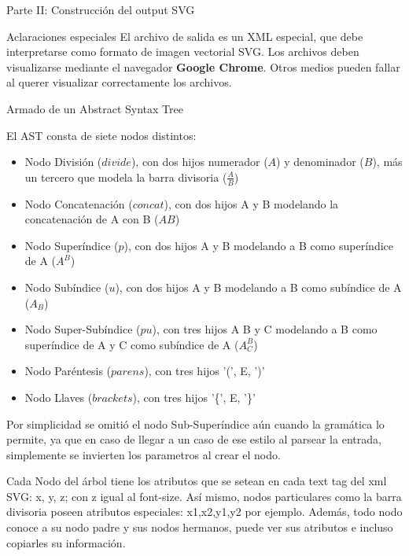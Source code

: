 \begin{section}{Parte II: Construcci\'on del output SVG}

\begin{subsection}{Aclaraciones especiales}
El archivo de salida es un XML especial, que debe interpretarse como formato de imagen vectorial SVG. Los archivos deben visualizarse mediante el navegador \textbf{Google Chrome}. Otros medios pueden fallar al querer visualizar correctamente los archivos.
\end{subsection}

\begin{subsection}{Armado de un Abstract Syntax Tree}

El AST consta de siete nodos distintos:

\begin{itemize}

\item Nodo Divisi\'on ($divide$), con dos hijos numerador ($A$) y denominador ($B$), m\'as un tercero que modela la barra divisoria ($\frac{A}{B}$)
\item Nodo Concatenaci\'on ($concat$), con dos hijos A y B modelando la concatenaci\'on de A con B ($AB$)
\item Nodo Super\'indice ($p$), con dos hijos A y B modelando a B como super\'indice de A ($A^{B}$)
\item Nodo Sub\'indice ($u$), con dos hijos A y B modelando a B como sub\'indice de A ($A_{B}$)
\item Nodo Super-Sub\'indice ($pu$), con tres hijos A B y C modelando a B como super\'indice de A y C como sub\'indice de A ($A^{B}_{C}$)
\item Nodo Par\'entesis ($parens$), con tres hijos '(', E, ')'
\item Nodo Llaves ($brackets$), con tres hijos '\{', E, '\}'


\end{itemize}


Por simplicidad se omiti\'o el nodo Sub-Super\'indice a\'un cuando la gram\'atica lo permite, ya que en caso de llegar a un caso de ese estilo al parsear la entrada, simplemente se invierten los parametros al crear el nodo. 

Cada Nodo del \'arbol tiene los atributos que se setean en cada text tag del xml SVG: x, y, z; con z igual al font-size. As\'i mismo, nodos particulares como la barra divisoria poseen atributos especiales: x1,x2,y1,y2 por ejemplo. Adem\'as, todo nodo conoce a su nodo padre y sus nodos hermanos, puede ver sus atributos e incluso copiarles su informaci\'on.


\end{subsection}
\end{section}
